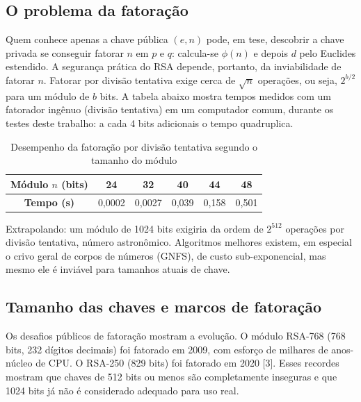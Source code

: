 \documentclass[11pt, a4paper]{article}
\begin{document}
\subsection{O problema da fatoração}
Quem conhece apenas a chave pública $(e, n)$ pode, em tese, descobrir a chave privada se conseguir fatorar $n$ em $p$ e $q$: calcula-se $\phi(n)$ e depois $d$ pelo Euclides estendido. A segurança prática do RSA depende, portanto, da inviabilidade de fatorar $n$. Fatorar por divisão tentativa exige cerca de $\sqrt{n}$ operações, ou seja, $2^{b/2}$ para um módulo de $b$ bits. A tabela abaixo mostra tempos medidos com um fatorador ingênuo (divisão tentativa) em um computador comum, durante os testes deste trabalho: a cada 4 bits adicionais o tempo quadruplica.

\begin{table}[h!]
    \centering
    \caption{Desempenho da fatoração por divisão tentativa segundo o tamanho do módulo}
    \begin{tabular}{cccccc}
        \toprule
        \textbf{Módulo $n$ (bits)} & 24 & 32 & 40 & 44 & 48 \\
        \midrule
        \textbf{Tempo (s)} & 0,0002 & 0,0027 & 0,039 & 0,158 & 0,501 \\
        \bottomrule
    \end{tabular}
\end{table}

Extrapolando: um módulo de 1024 bits exigiria da ordem de $2^{512}$ operações por divisão tentativa, número astronômico. Algoritmos melhores existem, em especial o crivo geral de corpos de números (GNFS), de custo sub-exponencial, mas mesmo ele é inviável para tamanhos atuais de chave.

\subsection{Tamanho das chaves e marcos de fatoração}
Os desafios públicos de fatoração mostram a evolução. O módulo RSA-768 (768 bits, 232 dígitos decimais) foi fatorado em 2009, com esforço de milhares de anos-núcleo de CPU. O RSA-250 (829 bits) foi fatorado em 2020 [3]. Esses recordes mostram que chaves de 512 bits ou menos são completamente inseguras e que 1024 bits já não é considerado adequado para uso real.
\end{document}
